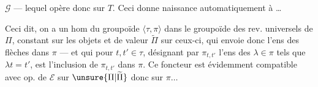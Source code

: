 $\mathcal G$ --- lequel opère donc sur $T$. Ceci donne naissance automatiquement à
\ldots

Ceci dit, on a un hom du groupoïde $\langle\tau,\pi\rangle$ dans le groupoïde des rev. universels de $\Pi$, constant sur les objets et de valeur $\widetilde\Pi$ sur ceux-ci, qui envoie donc l'ens des flèches dans $\pi$ --- et qui pour $t,t'\in\tau$, désignant par $\pi_{t,t'}$  l'ens des $\lambda\in\pi$ tels que $\lambda t=t'$, est l'inclusion de $\pi_{t,t'}$ dans $\pi$. Ce foncteur
est évidemment compatible avec op. de $\mathcal E$ sur $\unsure{\Pi|\widetilde\Pi}$ donc sur $\pi\ldots$
